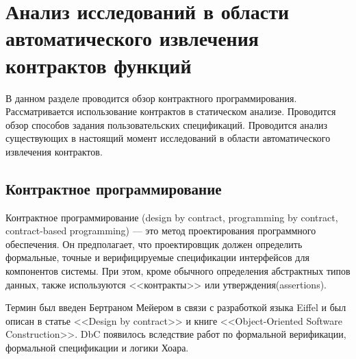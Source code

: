 \chapter{Анализ исследований в области автоматического извлечения контрактов функций}
В данном разделе проводится обзор контрактного программирования. Рассматривается использование контрактов в статическом анализе. Проводится обзор способов задания пользовательских спецификаций. Проводится анализ существующих в настоящий момент исследований в области автоматического извлечения контрактов.

\section{Контрактное программирование}
Контрактное программирование (design by contract, programming by contract, contract-based programming) --- это метод проектирования программного обеспечения. Он предполагает, что проектировщик должен определить формальные, точные и верифицируемые спецификации интерфейсов для компонентов системы. При этом, кроме обычного определения абстрактных типов данных, также используются <<контракты>> или утверждения(assertions).

Термин был введен Бертраном Мейером в связи с разработкой языка Eiffel и был описан в статье <<Design by contract>>\cite{designByContract} и книге <<Object-Oriented Software Construction>>\cite{oosc-meyer}. DbC появилось вследствие работ по формальной верификации, формальной спецификации и логики Хоара.

